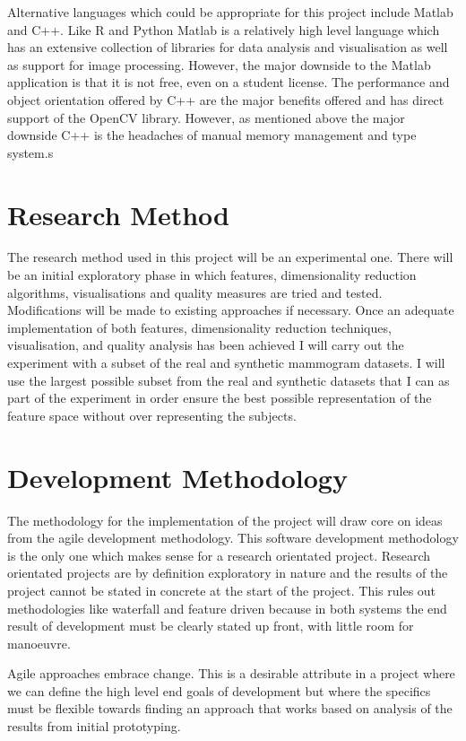 Alternative languages which could be appropriate for this project include Matlab and C++. Like R and Python Matlab \cite{matlab} is a relatively high level language which has an extensive collection of libraries for data analysis and visualisation as well as support for image processing. However, the major downside to the Matlab application is that it is not free, even on a student license. The performance and object orientation offered by C++ are the major benefits offered and has direct support of the OpenCV library. However, as mentioned above the major downside C++ is the headaches of manual memory management and type system.s 

\section{Research Method}
The research method used in this project will be an experimental one. There will be an initial exploratory phase in which features, dimensionality reduction algorithms, visualisations and quality measures are tried and tested. Modifications will be made to existing approaches if necessary. Once an adequate implementation of both features, dimensionality reduction techniques, visualisation, and quality analysis has been achieved I will carry out the experiment with a subset of the real and synthetic mammogram datasets. I will use the largest possible subset from the real and synthetic datasets that I can as part of the experiment in order ensure the best possible representation of the feature space without over representing the subjects.

\section{Development Methodology}
The methodology for the implementation of the project will draw core on ideas from the agile development methodology. This software development methodology is the only one which makes sense for a research orientated project. Research orientated projects are by definition exploratory in nature and the results of the project cannot be stated in concrete at the start of the project. This rules out methodologies like waterfall and feature driven because in both systems the end result of development must be clearly stated up front, with little room for manoeuvre.

Agile approaches embrace change. This is a desirable attribute in a project where we can define the high level end goals of development but where the specifics must be flexible towards finding an approach that works based on analysis of the results from initial prototyping.


